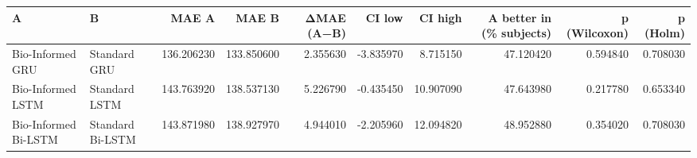 \begin{tabular}{llrrrrrrrr}
\toprule
A & B & MAE A & MAE B & ΔMAE (A−B) & CI low & CI high & A better in (\% subjects) & p (Wilcoxon) & p (Holm) \\
\midrule
Bio-Informed GRU & Standard GRU & 136.206230 & 133.850600 & 2.355630 & -3.835970 & 8.715150 & 47.120420 & 0.594840 & 0.708030 \\
Bio-Informed LSTM & Standard LSTM & 143.763920 & 138.537130 & 5.226790 & -0.435450 & 10.907090 & 47.643980 & 0.217780 & 0.653340 \\
Bio-Informed Bi-LSTM & Standard Bi-LSTM & 143.871980 & 138.927970 & 4.944010 & -2.205960 & 12.094820 & 48.952880 & 0.354020 & 0.708030 \\
\bottomrule
\end{tabular}
